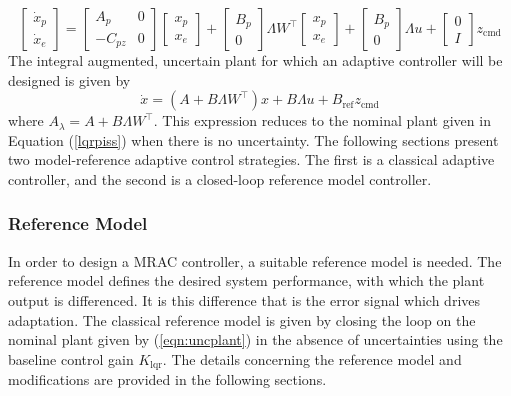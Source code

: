 \begin{equation}
  \begin{bmatrix}
    \dot{x}_{p} \\
    \dot{x}_{e}
  \end{bmatrix}=
  \begin{bmatrix}
    A_{p} & 0 \\
    -C_{pz} & 0
  \end{bmatrix}
  \begin{bmatrix}
    x_{p} \\
    x_{e}
  \end{bmatrix}+
  \begin{bmatrix}
    B_{p} \\
    0
  \end{bmatrix}\Lambda W^{\top}
  \begin{bmatrix}
    x_{p} \\
    x_{e}
  \end{bmatrix}+
  \begin{bmatrix}
    B_{p} \\
    0
  \end{bmatrix}\Lambda u+
  \begin{bmatrix}
    0 \\
    I
  \end{bmatrix}z_{\text{cmd}}
\end{equation}
The integral augmented, uncertain plant for which an adaptive controller will be designed is given by
\begin{equation}
  \label{eqn:uncplant}
  \dot{x}=(A+B\Lambda W^{\top})x+B\Lambda u+B_{\text{ref}}z_{\text{cmd}}
\end{equation}
where $A_{\lambda}=A+B\Lambda W^{\top}$.
This expression reduces to the nominal plant given in Equation (\ref{lqrpiss}) when there is no uncertainty.
The following sections present two model-reference adaptive control strategies.
The first is a classical adaptive controller, and the second is a closed-loop reference model controller.

\subsubsection*{Reference Model}

In order to design a MRAC controller, a suitable reference model is needed.
The reference model defines the desired system performance, with which the plant output is differenced.
It is this difference that is the error signal which drives adaptation.
The classical reference model is given by closing the loop on the nominal plant given by (\ref{eqn:uncplant}) in the absence of uncertainties using the baseline control gain $K_{\text{lqr}}$.
The details concerning the reference model and modifications are provided in the following sections.

